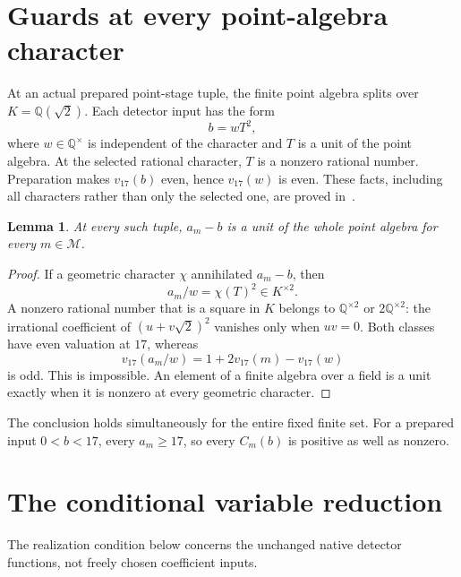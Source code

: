 \documentclass[11pt,a4paper]{article}
\newtheorem{lemma}[theorem]{Lemma}
\newcommand{\Q}{\mathbb Q}\newcommand{\Z}{\mathbb Z}
\begin{document}
\section{Guards at every point-algebra character}
At an actual prepared point-stage tuple, the finite point algebra
splits over $K=\Q(\sqrt2)$. Each detector input has the form
\begin{equation}\label{eq:native}
 b=wT^2,
\end{equation}
where $w\in\Q^\times$ is independent of the character and $T$ is a
unit of the point algebra. At the selected rational character, $T$ is
a nonzero rational number. Preparation makes $v_{17}(b)$ even, hence
$v_{17}(w)$ is even. These facts, including all characters rather than
only the selected one, are proved in~\cite[Sections 1--2]{Complements}.

\begin{lemma}\label{lem:guard}
At every such tuple, $a_m-b$ is a unit of the whole point algebra
for every $m\in\mathcal M$.
\end{lemma}
\begin{proof}
If a geometric character $\chi$ annihilated $a_m-b$, then
\[
                    a_m/w=\chi(T)^2\in K^{\times2}.
\]
A nonzero rational number that is a square in $K$ belongs to
$\Q^{\times2}$ or $2\Q^{\times2}$: the irrational coefficient of
$(u+v\sqrt2)^2$ vanishes only when $uv=0$. Both classes have even
valuation at $17$, whereas
\[
             v_{17}(a_m/w)=1+2v_{17}(m)-v_{17}(w)
\]
is odd. This is impossible. An element of a finite algebra over a
field is a unit exactly when it is nonzero at every geometric character.
\end{proof}

The conclusion holds simultaneously for the entire fixed finite set.
For a prepared input $0<b<17$, every $a_m\ge17$, so every $C_m(b)$
is positive as well as nonzero.

\section{The conditional variable reduction}
The realization condition below concerns the unchanged native detector
functions, not freely chosen coefficient inputs.
\end{document}
